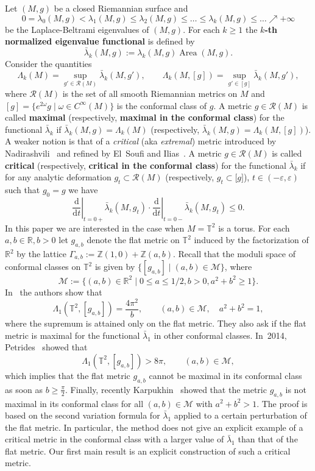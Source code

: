 \documentclass{amsart}
\let\le\leqslant
\let\ge\geqslant
\let\epsilon\varepsilon
\renewcommand{\d}{\mathrm{d}}
\DeclareMathOperator{\Area}{Area}
\theoremstyle{plain}
\theoremstyle{definition}
\theoremstyle{remark}
\begin{document}
Let \((M,g)\) be a closed Riemannian surface and
\[
0=\lambda_0(M,g)<\lambda_1(M,g)\le\lambda_2(M,g)\le\ldots\le\lambda_k(M,g)\le
\ldots\nearrow +\infty
\]
be the Laplace-Beltrami eigenvalues of \((M,g)\). For each \(k\ge 1\) the
\textbf{\(k\)-th normalized eigenvalue functional} is defined by
\[
\bar\lambda_k(M,g):=\lambda_k(M,g)\Area(M,g).
\]
Consider the quantities
\[
\Lambda_k(M)=\sup_{g'\in\mathcal R(M)}\bar\lambda_k(M,g'),\qquad
\Lambda_k(M,[g])=\sup_{g'\in [g]}\bar\lambda_k(M,g'),
\]
where \(\mathcal R(M)\) is the set of all smooth Riemannian metrics on \(M\) and
\([g]=\{e^{2\omega}g\mid\omega\in C^\infty(M)\}\) is the conformal class of
\(g\). A metric \(g\in\mathcal R(M)\) is called \textbf{maximal} (respectively,
\textbf{maximal in the conformal class}) for the functional \(\bar\lambda_k\) if
\(\bar\lambda_k(M,g)=\Lambda_k(M)\) (respectively,
\(\bar\lambda_k(M,g)=\Lambda_k(M,[g])\)). A weaker notion is that of a
\emph{critical} (aka \emph{extremal}) metric introduced by
Nadirashvili~\cite{Nad1996} and refined by El~Soufi and
Ilias~\cite{ElSI2000,ElSI2003,ElSI2008}. A metric \(g\in\mathcal R(M)\) is
called \textbf{critical} (respectively, \textbf{critical in the conformal
class}) for the functional \(\bar\lambda_k\) if for any analytic deformation
\(g_t\subset\mathcal R(M)\) (respectively, \(g_t\subset\mathcal [g]\)), \(t\in
(-\epsilon,\epsilon)\) such that \(g_0=g\) we have
\[
\left.\frac{\d}{\d t}\right|_{t=0+}\bar\lambda_k(M,g_t)\cdot
\left.\frac{\d}{\d t}\right|_{t=0-}\bar\lambda_k(M,g_t)\le 0.
\]
In this paper we are interested in the case when \(M=\mathbb T^2\) is a torus.
For each \(a,b\in\mathbb R,b>0\) let \(g_{a,b}\) denote the flat metric on
\(\mathbb T^2\) induced by the factorization of \(\mathbb R^2\) by the lattice
\(\Gamma_{a,b}:=\mathbb Z(1,0)+\mathbb Z(a,b)\). Recall that the moduli space of
conformal classes on \(\mathbb T^2\) is given by \(\{[g_{a,b}]\mid
(a,b)\in\mathcal M\}\), where
\[
\mathcal M:=\{(a,b)\in\mathbb R^2\mid 0\le a\le 1/2,b>0,a^2+b^2\ge 1\}.
\]
In~\cite{ElSIR1996} the authors show that
\[
\Lambda_1(\mathbb T^2,[g_{a,b}])=\frac{4\pi^2}b,\qquad (a,b)\in\mathcal M,\quad
a^2+b^2=1,
\]
where the supremum is attained only on the flat metric. They also ask if the
flat metric is maximal for the functional \(\bar\lambda_1\) in other conformal
classes. In~2014, Petrides~\cite[Theorem~1]{Pet2014} showed that
\begin{equation}\label{eq:intro-petrides}
\Lambda_1(\mathbb T^2,[g_{a,b}])>8\pi,\qquad (a,b)\in\mathcal M,
\end{equation}
which implies that the flat metric \(g_{a,b}\) cannot be maximal in its
conformal class as soon as \(b\ge\frac{\pi}2\). Finally, recently
Karpukhin~\cite[Theorem~1.1]{Kar2025} showed that the metric \(g_{a,b}\) is not
maximal in its conformal class for all \((a,b)\in\mathcal M\) with
\(a^2+b^2>1\). The proof is based on the second variation formula for
\(\bar\lambda_1\) applied to a certain perturbation of the flat metric. In
particular, the method does not give an explicit example of a critical metric in
the conformal class with a larger value of \(\bar\lambda_1\) than that of the
flat metric. Our first main result is an explicit construction of such a
critical metric.
\end{document}

